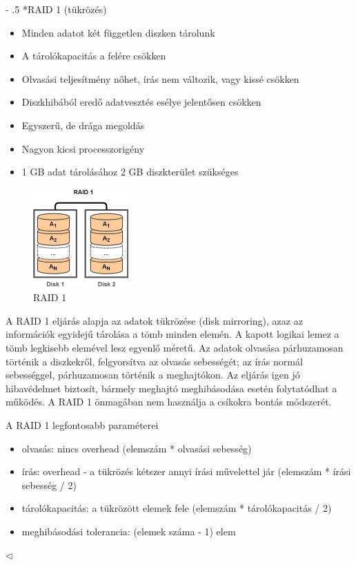 \documentclass[tikz,12pt,margin=0px]{article}
\makeatletter
\renewcommand\paragraph{%
	\@startsection{paragraph}{4}{0mm}%
	{-\baselineskip}%
	{.5\baselineskip}%
	{\normalfont\normalsize\bfseries}}
\makeatother
\begin{document}
	\paragraph*{RAID 1 (tükrözés)}

    \begin{itemize}[topsep=8pt,itemsep=4pt,partopsep=4pt, parsep=4pt]
        \item Minden adatot két független diszken tárolunk
        \item A tárolókapacitás a felére csökken
        \item Olvasási teljesítmény nőhet, írás nem változik, vagy kissé csökken
        \item Diszkhibából eredő adatvesztés esélye jelentősen csökken
        \item Egyszerű, de drága megoldás
        \item Nagyon kicsi processzorigény
        \item 1 GB adat tárolásához 2 GB diszkterület szükséges
    \end{itemize}

    \begin{figure}[H]
        \centering
        \includegraphics[width=0.325\textwidth]{img/raid1.png}
        \caption{RAID 1}
        \label{ref:raid1}
    \end{figure}

    {\footnotesize \noindent {\color{blue} \faLightbulbO\ $\triangleright$ } }
    {\footnotesize
    \noindent A RAID 1 eljárás alapja az adatok tükrözése (disk mirroring), azaz az információk egyidejű tárolása a tömb minden elemén. A kapott logikai lemez a tömb legkisebb elemével lesz egyenlő méretű. Az adatok olvasása párhuzamosan történik a diszkekről, felgyorsítva az olvasás sebességét; az írás normál sebességgel, párhuzamosan történik a meghajtókon. Az eljárás igen jó hibavédelmet biztosít, bármely meghajtó meghibásodása esetén folytatódhat a működés. A RAID 1 önmagában nem használja a csíkokra bontás módszerét.

    \noindent A RAID 1 legfontosabb paraméterei
    \begin{itemize}[topsep=8pt,itemsep=4pt,partopsep=4pt, parsep=4pt]
        \item olvasás: nincs overhead (elemszám * olvasási sebesség)
        \item írás: overhead - a tükrözés kétszer annyi írási művelettel jár (elemszám * írási sebesség / 2)
        \item tárolókapacitás: a tükrözött elemek fele (elemszám * tárolókapacitás / 2)
        \item meghibásodási tolerancia: (elemek száma - 1) elem
    \end{itemize}
    $\triangleleft$ \faLightbulbO}\\
\end{document}
